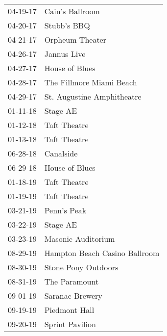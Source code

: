 \begin{supertabular}{p{0.25\columnwidth}p{0.75\columnwidth}}
 04-19-17 &                Cain's Ballroom \\
 04-20-17 &                    Stubb's BBQ \\
 04-21-17 &                Orpheum Theater \\
 04-26-17 &                    Jannus Live \\
 04-27-17 &                 House of Blues \\
 04-28-17 &       The Fillmore Miami Beach \\
 04-29-17 &     St. Augustine Amphitheatre \\
 01-11-18 &                       Stage AE \\
 01-12-18 &                   Taft Theatre \\
 01-13-18 &                   Taft Theatre \\
 06-28-18 &                      Canalside \\
 06-29-18 &                 House of Blues \\
 01-18-19 &                   Taft Theatre \\
 01-19-19 &                   Taft Theatre \\
 03-21-19 &                    Penn's Peak \\
 03-22-19 &                       Stage AE \\
 03-23-19 &             Masonic Auditorium \\
 08-29-19 &  Hampton Beach Casino Ballroom \\
 08-30-19 &            Stone Pony Outdoors \\
 08-31-19 &                  The Paramount \\
 09-01-19 &                Saranac Brewery \\
 09-19-19 &                  Piedmont Hall \\
 09-20-19 &                Sprint Pavilion \\
\end{supertabular}
